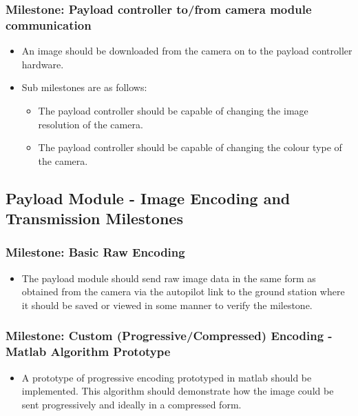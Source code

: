 	\subsubsection{Milestone: Payload controller to/from camera module communication}
	\label{sec:ms_init_payload_controller_camera_module}
		\begin{itemize}
			\item 	An image should be downloaded from the camera on to the 
				payload controller hardware.
			\item 	Sub milestones are as follows:
			\begin{itemize}
				\item The payload controller should be capable of changing the
					image resolution of the camera.
				\item The payload controller should be capable of changing the
					colour type of the camera.
			\end{itemize}
		\end{itemize}


\subsection{Payload Module - Image Encoding and Transmission Milestones}
	\subsubsection{Milestone: Basic Raw Encoding}
		\label{sec:ms_init_basic_raw_encoding}
		\begin{itemize}
			\item 	The payload module should send raw image data in the same form as 
				obtained from the camera via the autopilot link
				to the ground station where it should be saved or viewed in some manner
				to verify the milestone.
		\end{itemize}

	\subsubsection{Milestone: Custom (Progressive/Compressed) Encoding - Matlab Algorithm Prototype}
		\label{sec:ms_init_custom_enc_matlab}
		\begin{itemize}
			\item 	A prototype of progressive encoding prototyped in matlab
				should be implemented. This algorithm should demonstrate how the image
				could be sent progressively and ideally in a compressed form.
		\end{itemize}

